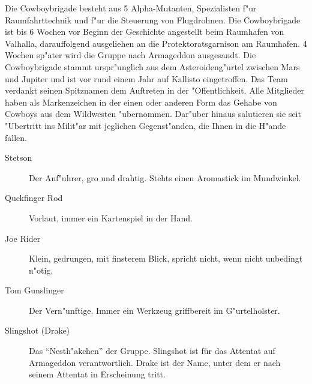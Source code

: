 
Die Cowboybrigade besteht aus 5 Alpha-Mutanten, Spezialisten f"ur Raumfahrttechnik und f"ur die Steuerung von Flugdrohnen. 
Die Cowboybrigade ist bis 6 Wochen vor Beginn der Geschichte angestellt beim Raumhafen von Valhalla, darauffolgend ausgeliehen an die Protektoratsgarnison am Raumhafen. 4 Wochen sp"ater wird die Gruppe nach Armageddon ausgesandt. Die Cowboybrigade stammt urspr"unglich aus dem Asteroideng"urtel zwischen Mars und Jupiter und ist vor rund einem Jahr auf Kallisto eingetroffen. Das Team verdankt seinen Spitznamen dem Auftreten in der "Offentlichkeit. Alle Mitglieder haben als Markenzeichen in der einen oder anderen Form das Gehabe von Cowboys aus dem Wildwesten  "ubernommen. Dar"uber hinaus salutieren sie seit "Ubertritt ins Milit"ar mit jeglichen Gegenst"anden, die Ihnen in die H"ande fallen.

\begin{description}
    \item[Stetson] Der Anf"uhrer, gro\3 und drahtig. Stehts einen Aromastick im Mundwinkel.
    \item[Quckfinger Rod] Vorlaut, immer ein Kartenspiel in der Hand.
    \item[Joe Rider] Klein, gedrungen, mit finsterem Blick, spricht nicht, wenn nicht unbedingt n"otig.
    \item[Tom Gunslinger] Der Vern"unftige. Immer ein Werkzeug griffbereit im G"urtelholster. 
    \item[Slingshot (Drake)] Das "`Nesth"akchen"' der Gruppe. Slingshot ist für das Attentat auf Armageddon verantwortlich. 
        Drake ist der Name, unter dem er nach seinem Attentat in Erscheinung tritt.
\end{description}

\newpage
